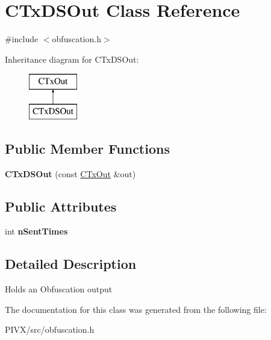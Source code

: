 \hypertarget{class_c_tx_d_s_out}{}\section{C\+Tx\+D\+S\+Out Class Reference}
\label{class_c_tx_d_s_out}


{\ttfamily \#include $<$obfuscation.\+h$>$}

Inheritance diagram for C\+Tx\+D\+S\+Out\+:\begin{figure}[H]
\begin{center}
\leavevmode
\includegraphics[height=2.000000cm]{class_c_tx_d_s_out}
\end{center}
\end{figure}
\subsection*{Public Member Functions}
\begin{DoxyCompactItemize}
\item 
\mbox{\label{class_c_tx_d_s_out_ab48888ca5165eaa165f49d8365f5c53e}} 
{\bfseries C\+Tx\+D\+S\+Out} (const \mbox{\hyperlink{class_c_tx_out}{C\+Tx\+Out}} \&out)
\end{DoxyCompactItemize}
\subsection*{Public Attributes}
\begin{DoxyCompactItemize}
\item 
\mbox{\label{class_c_tx_d_s_out_a6bd3a1e7c7b697062ef4f79699357052}} 
int {\bfseries n\+Sent\+Times}
\end{DoxyCompactItemize}


\subsection{Detailed Description}
Holds an Obfuscation output 

The documentation for this class was generated from the following file\+:\begin{DoxyCompactItemize}
\item 
P\+I\+V\+X/src/obfuscation.\+h\end{DoxyCompactItemize}
